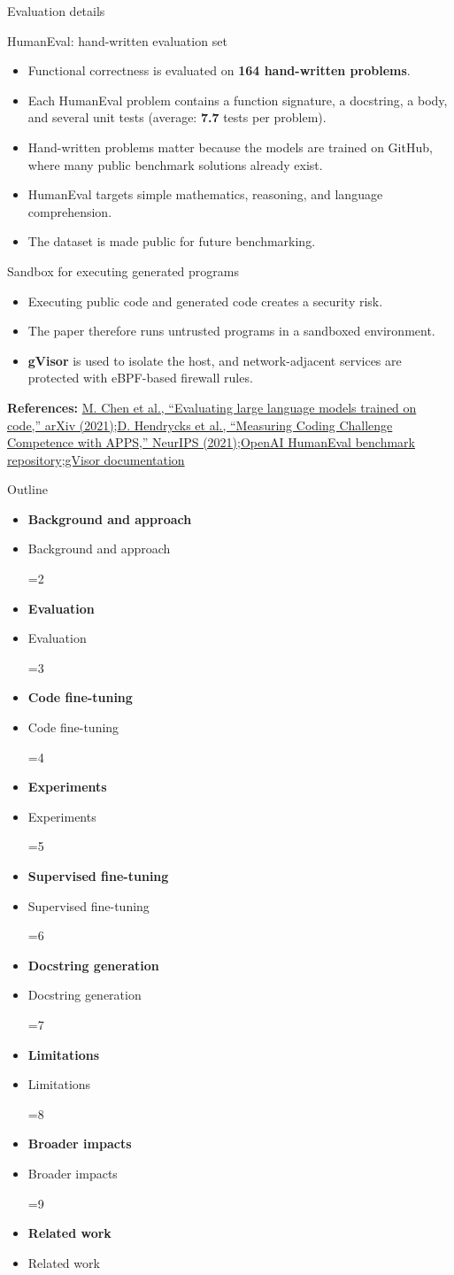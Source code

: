 \documentclass[aspectratio=43,9pt]{beamer}
\newcommand{\srclink}[2]{\href{#2}{\textcolor{black!68}{#1}}}
\newcommand{\sep}{;\hspace{0.35em}}
\newcommand{\refline}[2][References]{%
  \vfill
  {\raggedright\fontsize{5.1}{5.5}\selectfont\color{black!68}\textbf{#1:} #2\par}%
}
\newcommand{\srcChen}{\srclink{M. Chen et al., ``Evaluating large language models trained on code,'' arXiv (2021)}{https://arxiv.org/abs/2107.03374}}
\newcommand{\srcHumanEval}{\srclink{OpenAI HumanEval benchmark repository}{https://github.com/openai/human-eval}}
\newcommand{\srcGVisor}{\srclink{gVisor documentation}{https://gvisor.dev/}}
\newcommand{\srcHendrycks}{\srclink{D. Hendrycks et al., ``Measuring Coding Challenge Competence with APPS,'' NeurIPS (2021)}{https://arxiv.org/abs/2105.09938}}
\newcommand{\outlineitem}[2]{%
  \ifnum\currentstage=#1\relax
    \item[{\textcolor{black}{\large\textbullet}}] {\color{black}\bfseries #2}
  \else
    \item[{\textcolor{black}{\large\textbullet}}] {\color{black!70}#2}
  \fi
}
\newcommand{\outlineframe}[1]{%
\begin{frame}{Outline}
\small
\def\currentstage{#1}
\begin{itemize}
  \setlength{\itemsep}{0.45em}
  \outlineitem{1}{Background and approach}
  \outlineitem{2}{Evaluation}
  \outlineitem{3}{Code fine-tuning}
  \outlineitem{4}{Experiments}
  \outlineitem{5}{Supervised fine-tuning}
  \outlineitem{6}{Docstring generation}
  \outlineitem{7}{Limitations}
  \outlineitem{8}{Broader impacts}
  \outlineitem{9}{Related work}
\end{itemize}
\end{frame}
}
\begin{document}
\begin{frame}{Evaluation details}
\scriptsize
\begin{block}{HumanEval: hand-written evaluation set}
\begin{itemize}
  \item Functional correctness is evaluated on \textbf{164 hand-written problems}.
  \item Each HumanEval problem contains a function signature, a docstring, a body, and several unit tests (average: \textbf{7.7} tests per problem).
  \item Hand-written problems matter because the models are trained on GitHub, where many public benchmark solutions already exist.
  \item HumanEval targets simple mathematics, reasoning, and language comprehension.
  \item The dataset is made public for future benchmarking.
\end{itemize}
\end{block}

\begin{block}{Sandbox for executing generated programs}
\begin{itemize}
  \item Executing public code and generated code creates a security risk.
  \item The paper therefore runs untrusted programs in a sandboxed environment.
  \item \textbf{gVisor} is used to isolate the host, and network-adjacent services are protected with eBPF-based firewall rules.
\end{itemize}
\end{block}

\refline{\srcChen\sep \srcHendrycks\sep \srcHumanEval\sep \srcGVisor}
\end{frame}

\outlineframe{3}
\end{document}
